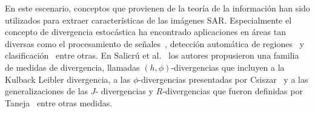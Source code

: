 \documentclass[11pt]{article}
\begin{document}
En este escenario, conceptos que provienen de la teoría de la información han sido utilizados para extraer características de las imágenes SAR. Especialmente el concepto de divergencia estocástica ha encontrado aplicaciones en áreas tan diversas como el procesamiento de señales~\cite {Aviyente2007}, detección automática de regiones~\cite{Nascimento2009,SilvaCribariFrery:ImprovedLikelihood:Environmetrics} y clasificación~\cite{Puig2003} entre otras. 
En Salicrú et al.~\cite{Salicru1994} los autores propusieron una familia de medidas de divergencia, llamadas $(h,\phi)$-divergencias que incluyen a la Kulback Leibler divergencia, a las $\phi$-divergencias presentadas por Csiszar~\cite{Csiszar1967} y a las generalizaciones de las $J$- divergencias y $R$-divergencias que fueron definidas por Taneja~\cite{Taneja1989} entre otras medidas. 


%
%
\end{document}
